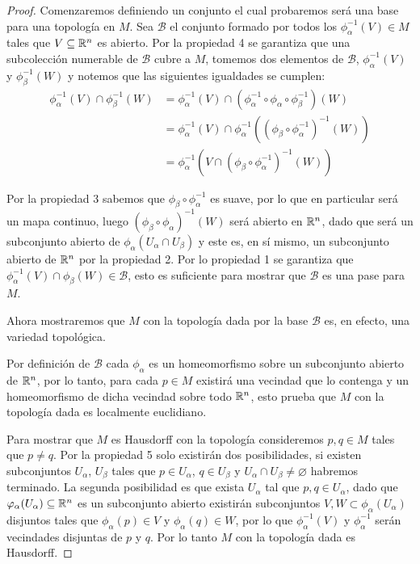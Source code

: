 \begin{proof}
	Comenzaremos definiendo un conjunto el cual probaremos será una base para una topología en $M$. Sea $\mathcal{B}$ el conjunto formado por todos los $\phi_{\alpha}^{-1}(V) \in M$ tales que $V \subseteq \mathbb{R}^n$ es abierto. Por la propiedad 4 se garantiza que una subcolección numerable de $\mathcal{B}$ cubre a $M$, tomemos dos elementos de $\mathcal{B}$, $\phi_{\alpha}^{-1}(V)$ y $\phi_{\beta}^{-1}(W)$ y notemos que las siguientes igualdades se cumplen:
	\begin{align*}
		\phi_{\alpha}^{-1}(V) \cap \phi_{\beta}^{-1}(W) & = \phi_{\alpha}^{-1}(V) \cap (\phi_{\alpha}^{-1} \circ \phi_{\alpha} \circ \phi_{\beta}^{-1})(W)  \\
		                                                & = \phi_{\alpha}^{-1}(V) \cap \phi_{\alpha}^{-1} ((\phi_{\beta} \circ \phi_{\alpha}^{-1})^{-1}(W)) \\
		                                                & = \phi_{\alpha}^{-1} (V \cap (\phi_{\beta} \circ \phi_{\alpha}^{-1})^{-1}(W))
	\end{align*}

	Por la propiedad 3 sabemos que $\phi_{\beta} \circ \phi_{\alpha}^{-1}$ es suave, por lo que en particular será un mapa continuo, luego $(\phi_{\beta} \circ \phi_{\alpha})^{-1}(W)$ será abierto en $\mathbb{R}^n$, dado que será un subconjunto abierto de $\phi_{\alpha}(U_{\alpha} \cap U_{\beta})$ y este es, en sí mismo, un subconjunto abierto de $\mathbb{R}^n$ por la propiedad 2. Por lo propiedad 1 se garantiza que $\phi_{\alpha}^{-1}(V) \cap \phi_{\beta}(W) \in \mathcal{B}$, esto es suficiente para mostrar que $\mathcal{B}$ es una pase para $M$.

	Ahora mostraremos que $M$ con la topología dada por la base $\mathcal{B}$ es, en efecto, una variedad topológica.

	Por definición de $\mathcal{B}$ cada $\phi_{\alpha}$ es un homeomorfismo sobre un subconjunto abierto de $\mathbb{R}^n$, por lo tanto, para cada $p \in M$ existirá una vecindad que lo contenga y un homeomorfismo de dicha vecindad sobre todo $\mathbb{R}^n$, esto prueba que $M$ con la topología dada es localmente euclidiano.

	Para mostrar que $M$ es Hausdorff con la topología consideremos $p, q \in M$ tales que $p \neq q$. Por la propiedad 5 solo existirán dos posibilidades, si existen subconjuntos $U_{\alpha}$, $U_{\beta}$ tales que $p \in U_{\alpha}$, $q \in U_{\beta}$ y $U_{\alpha} \cap U_{\beta} \neq \varnothing$ habremos terminado. La segunda posibilidad es que exista $U_{\alpha}$ tal que $p, q \in U_{\alpha}$, dado que $\varphi_{\alpha}(U_{\alpha}) \subseteq \mathbb{R}^n$ es un subconjunto abierto existirán subconjuntos $V,W \subset \phi_{\alpha}(U_{\alpha})$ disjuntos tales que $\phi_{\alpha}(p) \in V$ y $\phi_{\alpha}(q) \in W$, por lo que $\phi_{\alpha}^{-1}(V)$ y $\phi_{\alpha}^{-1}$ serán vecindades disjuntas de $p$ y $q$. Por lo tanto $M$ con la topología dada es Hausdorff.


\end{proof}

